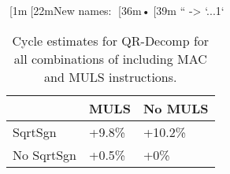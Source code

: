 [1m[22mNew names:
[36m•[39m `` -> `...1`
\begin{table}[ht]
\centering
\begin{tabular}{lll}
  \hline
  & MULS & No MULS \\ 
  \hline
SqrtSgn & +9.8\% & +10.2\% \\ 
  No SqrtSgn & +0.5\% & +0\% \\ 
   \hline
\end{tabular}
\caption{Cycle estimates for QR-Decomp for all combinations of including MAC and MULS instructions.} 
\end{table}